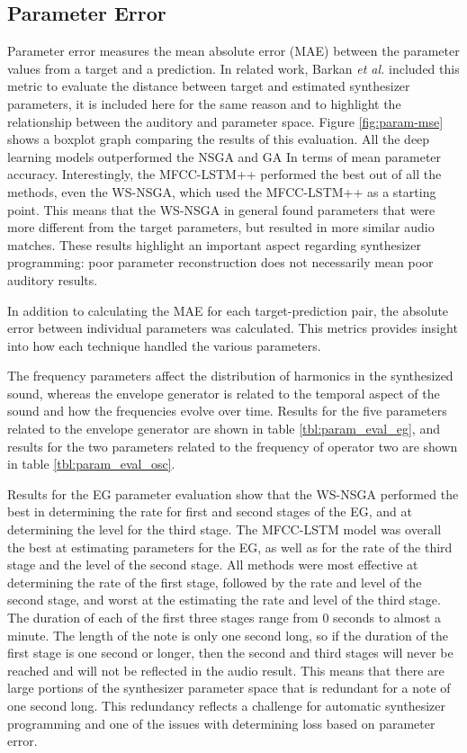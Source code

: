 \subsection{Parameter Error}
Parameter error measures the mean absolute error (MAE) between the parameter values from a target and a prediction. In related work, Barkan \textit{et al.} included this metric to evaluate the distance between target and estimated synthesizer parameters, it is included here for the same reason and to highlight the relationship between the auditory and parameter space. Figure \ref{fig:param-mse} shows a boxplot graph comparing the results of this evaluation. All the deep learning models outperformed the NSGA and GA In terms of mean parameter accuracy. Interestingly, the MFCC-LSTM++ performed the best out of all the methods, even the WS-NSGA, which used the MFCC-LSTM++ as a starting point. This means that the WS-NSGA in general found parameters that were more different from the target parameters, but resulted in more similar audio matches. These results highlight an important aspect regarding synthesizer programming: poor parameter reconstruction does not necessarily mean poor auditory results.

In addition to calculating the MAE for each target-prediction pair, the absolute error between individual parameters was calculated. This metrics provides insight into how each technique handled the various parameters.

The frequency parameters affect the distribution of harmonics in the synthesized sound, whereas the envelope generator is related to the temporal aspect of the sound and how the frequencies evolve over time. Results for the five parameters related to the envelope generator are shown in table \ref{tbl:param_eval_eg}, and results for the two parameters related to the frequency of operator two are shown in table \ref{tbl:param_eval_osc}.

Results for the EG parameter evaluation show that the WS-NSGA performed the best in determining the rate for first and second stages of the EG, and at determining the level for the third stage. The MFCC-LSTM model was overall the best at estimating parameters for the EG, as well as for the rate of the third stage and the level of the second stage. All methods were most effective at determining the rate of the first stage, followed by the rate and level of the second stage, and worst at the estimating the rate and level of the third stage. The duration of each of the first three stages range from 0 seconds to almost a minute. The length of the note is only one second long, so if the duration of the first stage is one second or longer, then the second and third stages will never be reached and will not be reflected in the audio result. This  means that there are large portions of the synthesizer parameter space that is redundant for a note of one second long.  This redundancy reflects a challenge for automatic synthesizer programming and one of the issues with determining loss based on parameter error.

